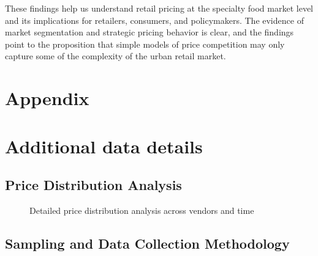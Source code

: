 \documentclass[
  letterpaper,
  DIV=11,
  numbers=noendperiod]{scrartcl}
\begin{document}
These findings help us understand retail pricing at the specialty food
market level and its implications for retailers, consumers, and
policymakers. The evidence of market segmentation and strategic pricing
behavior is clear, and the findings point to the proposition that simple
models of price competition may only capture some of the complexity of
the urban retail market.

\newpage

\appendix

\section*{Appendix}\label{appendix}

\section{Additional data details}\label{additional-data-details}

\subsection{Price Distribution
Analysis}\label{price-distribution-analysis}

\begin{figure}


\caption{\label{fig-price-detail}Detailed price distribution analysis
across vendors and time}

\end{figure}%

\subsection{Sampling and Data Collection
Methodology}\label{sampling-and-data-collection-methodology}
\end{document}
